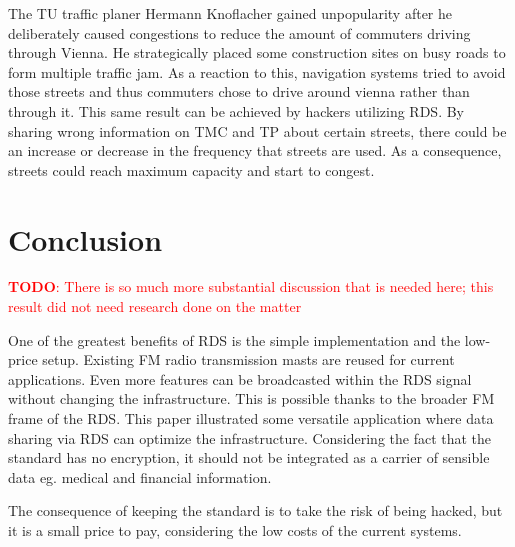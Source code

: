 \documentclass[conference,11pt,a4paper]{IEEEtran}
\newcommand{\todo}[1]{\textcolor{red}{\textbf{TODO}: #1}}
\begin{document}
	The TU traffic planer Hermann Knoflacher gained unpopularity after he deliberately caused congestions to reduce the amount of commuters driving through Vienna.
	He strategically placed some construction sites on busy roads to form multiple traffic jam\cite{presse}. As a reaction to this, navigation systems tried to avoid those streets and thus commuters chose to drive around vienna rather than through it. This same result can be achieved by hackers utilizing RDS. By sharing wrong information on TMC and TP about certain streets, there could be an increase or decrease in the frequency that streets are used. As a consequence, streets could reach maximum capacity and start to congest.\\
	
	
	\section {Conclusion}
	\todo{There is so much more substantial discussion that is needed here; this result did not need research done on the matter}
	
	One of the greatest benefits of RDS is the simple implementation and the low-price setup. Existing FM radio transmission masts are reused for current applications. Even more features can be broadcasted within the RDS signal without changing the infrastructure. This is possible thanks to the broader FM frame of the RDS. This paper illustrated some versatile application where data sharing via RDS can optimize the infrastructure. Considering the fact that the standard has no encryption, it should not be integrated as a carrier of sensible data eg. medical and financial information. 
	
	The consequence of keeping the standard is to take the risk of being hacked, but it is a small price to pay, considering the low costs of the current systems. 
	
	
	
	
\end{document}
